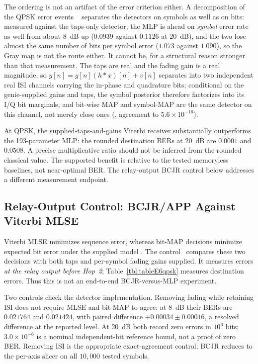 The ordering is not an artifact of the error criterion either. A decomposition of the QPSK error events ~ separates the detectors on symbols as well as on bits: measured against the taps-only detector, the MLP is ahead on \emph{symbol} error rate as well from about 8~dB up ($0.0939$ against $0.1126$ at 20~dB), and the two lose almost the same number of bits per symbol error ($1.073$ against $1.090$), so the Gray map is not the route either. It cannot be, for a structural reason stronger than that measurement. The taps are real and the fading gain is a real magnitude, so $y[n] = g[n](h*x)[n] + v[n]$ separates into two independent real ISI channels carrying the in-phase and quadrature bits; conditional on the genie-supplied gains and taps, the symbol posterior therefore factorizes into its I/Q bit marginals, and bit-wise MAP and symbol-MAP are the same detector on this channel, not merely close ones (, agreement to $5.6\times10^{-16}$).

At QPSK, the supplied-taps-and-gains Viterbi receiver substantially outperforms the 193-parameter MLP: the rounded destination BERs at 20~dB are $0.0001$ and $0.0508$. A precise multiplicative ratio should not be inferred from the rounded classical value. The supported benefit is relative to the tested memoryless baselines, not near-optimal BER. The relay-output BCJR control below addresses a different measurement endpoint.

\subsection{Relay-Output Control: BCJR/APP Against Viterbi MLSE}\label{sec:bcjr-benchmark}

Viterbi MLSE minimizes sequence error, whereas bit-MAP decisions minimize expected bit error under the supplied model \cite{BahlCockeJelinekRaviv1974BCJR}. The control~ compares these two decisions with both taps and per-symbol fading gains supplied. It measures errors \emph{at the relay output before Hop~2}; Table~\ref{tbl:tableE6qpsk} measures destination errors. Thus this is not an end-to-end BCJR-versus-MLP experiment.

Two controls check the detector implementation. Removing fading while retaining ISI does not require MLSE and bit-MAP to agree: at 8~dB their BERs are $0.021764$ and $0.021424$, with paired difference $+0.00034\pm0.00016$, a resolved difference at the reported level. At 20~dB both record zero errors in $10^6$ bits; $3.0\times10^{-6}$ is a nominal independent-bit reference bound, not a proof of zero BER. Removing ISI is the appropriate exact-agreement control: BCJR reduces to the per-axis slicer on all $10{,}000$ tested symbols.

